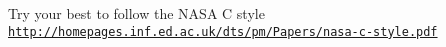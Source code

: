 Try your best to follow the N\+A\+SA C style \href{http://homepages.inf.ed.ac.uk/dts/pm/Papers/nasa-c-style.pdf}{\tt http\+://homepages.\+inf.\+ed.\+ac.\+uk/dts/pm/\+Papers/nasa-\/c-\/style.\+pdf} 